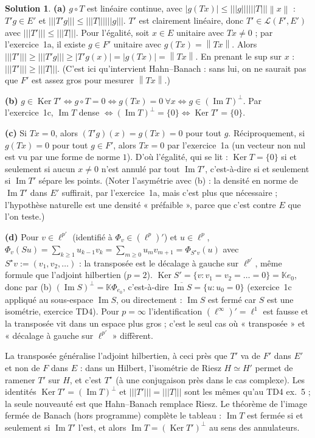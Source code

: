 \documentclass[11pt,a4paper]{article}
\newcommand{\K}{\mathbb{K}}
\newcommand{\adh}[1]{\overline{#1}}
\newcommand{\norm}[1]{\left\|#1\right\|}
\newcommand{\opnorm}[1]{|\!|\!|#1|\!|\!|}
\newcommand{\Lc}{\mathcal{L}}
\newcommand{\ie}{c'est-à-dire}
\DeclareMathOperator{\Ker}{Ker}
\DeclareMathOperator{\Ima}{Im}
\theoremstyle{definition}
\newtheorem*{solution}{Solution}
\begin{document}
\begin{solution}
\noindent\textbf{(a)} $g\circ T$ est linéaire continue, avec $|g(Tx)|\le\opnorm g\opnorm T\norm x$ : $T'g\in E'$ et $\opnorm{T'g}\le\opnorm T\opnorm g$. $T'$ est clairement linéaire, donc $T'\in\Lc(F',E')$ avec $\opnorm{T'}\le\opnorm T$. Pour l'égalité, soit $x\in E$ unitaire avec $Tx\ne0$ ; par l'exercice~1a, il existe $g\in F'$ unitaire avec $g(Tx)=\norm{Tx}$. Alors $\opnorm{T'}\ge\opnorm{T'g}\ge|T'g(x)|=|g(Tx)|=\norm{Tx}$. En prenant le sup sur $x$ : $\opnorm{T'}\ge\opnorm T$. (C'est ici qu'intervient Hahn--Banach : sans lui, on ne saurait pas que $F'$ est assez gros pour mesurer $\norm{Tx}$.)

\medskip
\noindent\textbf{(b)} $g\in\Ker T'\iff g\circ T=0\iff g(Tx)=0\ \forall x\iff g\in(\Ima T)^\perp$. Par l'exercice~1c, $\Ima T$ dense $\iff(\Ima T)^\perp=\{0\}\iff\Ker T'=\{0\}$.

\medskip
\noindent\textbf{(c)} Si $Tx=0$, alors $(T'g)(x)=g(Tx)=0$ pour tout $g$. Réciproquement, si $g(Tx)=0$ pour tout $g\in F'$, alors $Tx=0$ par l'exercice~1a (un vecteur non nul est vu par une forme de norme $1$). D'où l'égalité, qui se lit : $\Ker T=\{0\}$ si et seulement si aucun $x\ne0$ n'est annulé par tout $\Ima T'$, \ie{} si et seulement si $\Ima T'$ sépare les points. (Noter l'asymétrie avec (b) : la densité en norme de $\Ima T'$ dans $E'$ suffirait, par l'exercice~1a, mais c'est plus que nécessaire ; l'hypothèse naturelle est une densité « préfaible », parce que c'est contre $E$ que l'on teste.)

\medskip
\noindent\textbf{(d)} Pour $v\in\ell^{p'}$ (identifié à $\Phi_v\in(\ell^p)'$) et $u\in\ell^p$, $\Phi_v(Su)=\sum_{k\ge1}u_{k-1}v_k=\sum_{m\ge0}u_mv_{m+1}=\Phi_{S^\star v}(u)$ avec $S^\star v:=(v_1,v_2,\dots)$ : la transposée est le décalage à gauche sur $\ell^{p'}$, même formule que l'adjoint hilbertien ($p=2$). $\Ker S'=\{v:v_1=v_2=\dots=0\}=\K e_0$, donc par (b) $(\Ima S)^\perp=\K\Phi_{e_0}$, \ie{} $\adh{\Ima S}=\{u:u_0=0\}$ (exercice~1c appliqué au sous-espace $\Ima S$, ou directement : $\Ima S$ est fermé car $S$ est une isométrie, exercice TD4). Pour $p=\infty$ l'identification $(\ell^\infty)'=\ell^1$ est fausse et la transposée vit dans un espace plus gros ; c'est le seul cas où « transposée » et « décalage à gauche sur $\ell^{p'}$ » diffèrent.
\end{solution}

\begin{commentaire}
La transposée généralise l'adjoint hilbertien, à ceci près que $T'$ va de $F'$ dans $E'$ et non de $F$ dans $E$ : dans un Hilbert, l'isométrie de Riesz $H\simeq H'$ permet de ramener $T'$ sur $H$, et c'est $T^\star$ (à une conjugaison près dans le cas complexe). Les identités $\Ker T'=(\Ima T)^\perp$ et $\opnorm{T'}=\opnorm T$ sont les mêmes qu'au TD4 ex.~5 ; la seule nouveauté est que Hahn--Banach remplace Riesz. Le théorème de l'image fermée de Banach (hors programme) complète le tableau : $\Ima T$ est fermée si et seulement si $\Ima T'$ l'est, et alors $\Ima T=(\Ker T')^{\perp}$ au sens des annulateurs.
\end{commentaire}
\end{document}
